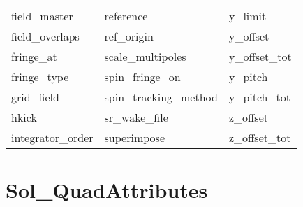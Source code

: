 \begin{tabular}{lll}
field_master                & reference                   & y_limit                     \\
field_overlaps              & ref_origin                  & y_offset                    \\
fringe_at                   & scale_multipoles            & y_offset_tot                \\
fringe_type                 & spin_fringe_on              & y_pitch                     \\
grid_field                  & spin_tracking_method        & y_pitch_tot                 \\
hkick                       & sr_wake_file                & z_offset                    \\
integrator_order            & superimpose                 & z_offset_tot                \\
 \bottomrule
 \end{tabular}
 \vfill
 
 \section{Sol_QuadAttributes}
 \label{s:list.sol.quad}
 
